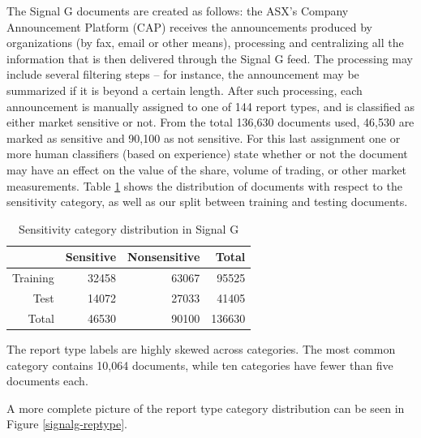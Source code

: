\documentclass[a4paper,twocolumn]{article}
\begin{document}
The Signal G documents are created as follows: the ASX's Company
Announcement Platform (CAP) receives the announcements produced by
organizations (by fax, email or other means), processing and
centralizing all the information that is then delivered through the
Signal G feed. The processing may include several filtering steps --
for instance, the announcement may be summarized if it is beyond a
certain length.  After such processing, each announcement is manually
assigned to one of 144 report types, and is classified as either
market sensitive or not. From the total 136,630 documents used, 46,530
are marked as sensitive and 90,100 as not sensitive. For this last
assignment one or more human classifiers (based on experience) state
whether or not the document may have an effect on the value of the
share, volume of trading, or other market measurements.  Table
\ref{signalg-sensitivity} shows the distribution of documents with
respect to the sensitivity category, as well as our split between
training and testing documents.

\begin{table}
\begin{tabular}{|r|r|r|r|}
\hline
         & Sensitive & Nonsensitive & Total \\
\hline
Training & 32458     & 63067        & 95525 \\
\hline
Test     & 14072     & 27033        & 41405 \\
\hline
Total    & 46530     & 90100        & 136630\\
\hline
\end{tabular}
\caption{Sensitivity category distribution in Signal G}
\label{signalg-sensitivity}
\end{table}

The report type labels are highly skewed across categories.  The most
common category contains 10,064 documents, while ten categories have
fewer than five documents each.

A more complete picture of the report type category distribution can
be seen in Figure \ref{signalg-reptype}.
\end{document}
